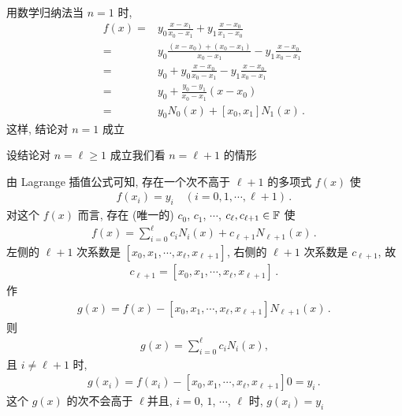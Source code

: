 \begin{pf}
    用数学归纳法\period 当 $n=1$ 时,
    \begin{align*}
        f(x)
        = {} & y_0 \frac{x - x_1}{x_0 - x_1}
        + y_1 \frac{x - x_0}{x_1 - x_0}                      \\
        = {} & y_0 \frac{(x - x_0) + (x_0 - x_1)}{x_0 - x_1}
        - y_1 \frac{x - x_0}{x_0 - x_1}                      \\
        = {} & y_0 + y_0 \frac{x - x_0}{x_0 - x_1}
        - y_1 \frac{x - x_0}{x_0 - x_1}                      \\
        = {} & y_0 + \frac{y_0 - y_1}{x_0 - x_1} (x - x_0)   \\
        = {} & y_0 N_0 (x) + [x_0, x_1] N_1 (x) \period
    \end{align*}
    这样, 结论对 $n=1$ 成立\period

    设结论对 $n = \ell \geq 1$ 成立\period 我们看 $n = \ell + 1$ 的情形\period

    由 Lagrange 插值公式可知, 存在一个次不高于 $\ell + 1$ 的多项式 $f(x)$ 使
    \begin{align*}
        f(x_i) = y_i \quad (i = 0,1,\cdots,\ell + 1) \period
    \end{align*}
    对这个 $f(x)$ 而言, 存在 (唯一的) $c_0$, $c_1$, $\cdots$, $c_{\ell}, c_{\ell + 1} \in \mathbb{F}$ 使
    \begin{align*}
        f(x) = \sum_{i = 0}^{\ell} c_i N_{i} (x) + c_{\ell + 1} N_{\ell + 1} (x) \period
    \end{align*}
    左侧的 $\ell + 1$ 次系数是 $[x_0, x_1, \cdots, x_\ell, x_{\ell + 1}]$, 右侧的 $\ell + 1$ 次系数是 $c_{\ell + 1}$, 故
    \begin{align*}
        c_{\ell + 1} = [x_0, x_1, \cdots, x_\ell, x_{\ell + 1}] \period
    \end{align*}
    作
    \begin{align*}
        g(x) = f(x) - [x_0, x_1, \cdots, x_\ell, x_{\ell + 1}] N_{\ell + 1} (x) \period
    \end{align*}
    则
    \begin{align*}
        g(x) = \sum_{i = 0}^{\ell} c_i N_{i} (x),
    \end{align*}
    且 $i \neq \ell + 1$ 时,
    \begin{align*}
        g(x_i) = f(x_i) - [x_0, x_1, \cdots, x_\ell, x_{\ell + 1}] 0 = y_i \period
    \end{align*}
    这个 $g(x)$ 的次不会高于 $\ell$\period 并且, $i = 0$, $1$, $\cdots$, $\ell$ 时, $g(x_i) = y_i$\period


\end{pf}

